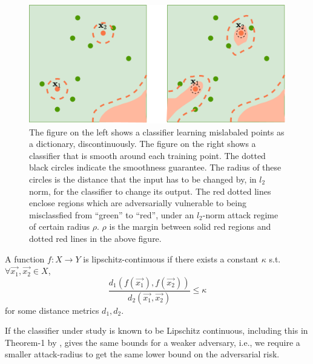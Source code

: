 \documentclass{ociamthesis}
\begin{document}
\begin{figure}
    \centering
    \includegraphics[scale=0.3]{memorizing-as-dictionary}
    \caption{The figure on the left shows a classifier learning mislabaled
    points as a dictionary, discontinuously. The figure on the right shows a
    classifier that is smooth around each training point. The dotted black
    circles indicate the smoothness guarantee. The radius of these circles is
    the distance that the input has to be changed by, in $l_2$ norm, for the
    classifier to change its output. The red dotted lines enclose regions which
    are adversarially vulnerable to being misclassfied from ``green'' to
    ``red'', under an $l_2$-norm attack regime of certain radius $\rho$. $\rho$
    is the margin between solid red regions and dotted red lines in the above
    figure.}
    \label{fig:dictionary}
\end{figure}

\begin{figure}
    \centering

\end{figure}

A function $f: X \to Y$ is lipschitz-continuous if there exists a constant
$\kappa$ s.t. $\forall \vec{x_1}, \vec{x_2} \in X$,
\begin{equation*}
    \label{eq:lipschitz}
    \frac{d_1({f(\vec{x_1}), f(\vec{x_2})})}
        {d_2({\vec{x_1}, \vec{x_2}})}
    \leq \kappa
\end{equation*}
for some distance metrics $d_1, d_2$.

If the classifier under study is known to be Lipschitz continuous, including
this in Theorem-1 by \citet{sanyal2021how}, gives the same bounds for a weaker
adversary, i.e., we require a smaller attack-radius to get the same lower bound
on the adversarial risk.
\end{document}
